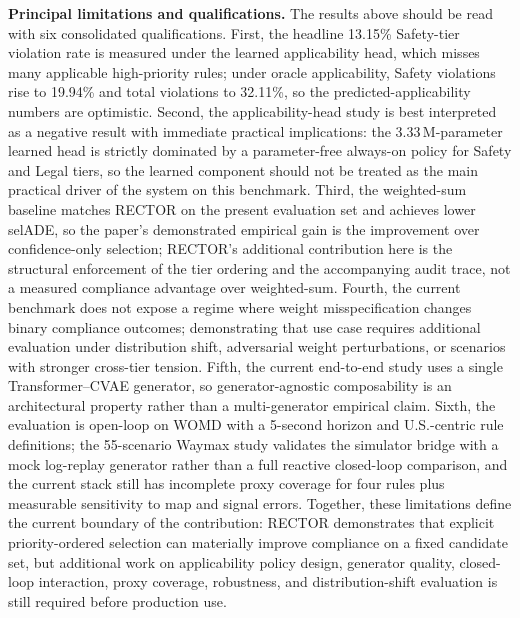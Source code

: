 \textbf{Principal limitations and qualifications.}
The results above should be read with six consolidated qualifications.  First, the headline 13.15\% Safety-tier violation rate is measured under the learned applicability head, which misses many applicable high-priority rules; under oracle applicability, Safety violations rise to 19.94\% and total violations to 32.11\%, so the predicted-applicability numbers are optimistic.  Second, the applicability-head study is best interpreted as a negative result with immediate practical implications: the 3.33\,M-parameter learned head is strictly dominated by a parameter-free always-on policy for Safety and Legal tiers, so the learned component should not be treated as the main practical driver of the system on this benchmark.  Third, the weighted-sum baseline matches RECTOR on the present evaluation set and achieves lower selADE, so the paper's demonstrated empirical gain is the improvement over confidence-only selection; RECTOR's additional contribution here is the structural enforcement of the tier ordering and the accompanying audit trace, not a measured compliance advantage over weighted-sum.  Fourth, the current benchmark does not expose a regime where weight misspecification changes binary compliance outcomes; demonstrating that use case requires additional evaluation under distribution shift, adversarial weight perturbations, or scenarios with stronger cross-tier tension.  Fifth, the current end-to-end study uses a single Transformer--CVAE generator, so generator-agnostic composability is an architectural property rather than a multi-generator empirical claim.  Sixth, the evaluation is open-loop on WOMD with a 5-second horizon and U.S.-centric rule definitions; the 55-scenario Waymax study validates the simulator bridge with a mock log-replay generator rather than a full reactive closed-loop comparison, and the current stack still has incomplete proxy coverage for four rules plus measurable sensitivity to map and signal errors.  Together, these limitations define the current boundary of the contribution: RECTOR demonstrates that explicit priority-ordered selection can materially improve compliance on a fixed candidate set, but additional work on applicability policy design, generator quality, closed-loop interaction, proxy coverage, robustness, and distribution-shift evaluation is still required before production use.
